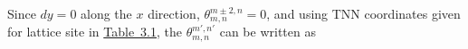 \noindent Since $dy = 0$ along the $x$ direction, $\theta_{m,n}^{m \pm 2, n} = 0$, and using \ac{TNN} coordinates given for lattice site in \hyperref[Table 2.1]{Table~3.1}, the $\theta_{m,n}^{m',n'}$ can be written as
